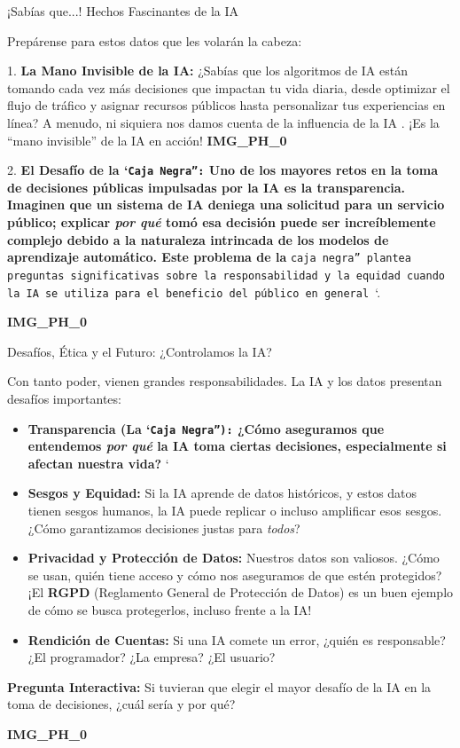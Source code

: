 \documentclass[aspectratio=169]{beamer}
\begin{document}
\begin{frame}[fragile]{¡Sabías que...! Hechos Fascinantes de la IA}


Prepárense para estos datos que les volarán la cabeza:

1.  \textbf{La Mano Invisible de la IA:} ¿Sabías que los algoritmos de IA están tomando cada vez más decisiones que impactan tu vida diaria, desde optimizar el flujo de tráfico y asignar recursos públicos hasta personalizar tus experiencias en línea? A menudo, ni siquiera nos damos cuenta de la influencia de la IA \texttt{\cite{Aparicio Araque, 2025}}. ¡Es la ``mano invisible'' de la IA en acción!
\textbf{IMG\_PH\_0}

2.  \textbf{El Desafío de la `\texttt{Caja Negra'':} Uno de los mayores retos en la toma de decisiones públicas impulsadas por la IA es la \textbf{transparencia}. Imaginen que un sistema de IA deniega una solicitud para un servicio público; explicar \textit{por qué} tomó esa decisión puede ser increíblemente complejo debido a la naturaleza intrincada de los modelos de aprendizaje automático. Este problema de la }\texttt{caja negra'' plantea preguntas significativas sobre la responsabilidad y la equidad cuando la IA se utiliza para el beneficio del público en general }\cite{Zouak Lara, 2025}`.

\textbf{IMG\_PH\_0}

\end{frame}



\begin{frame}[fragile]{Desafíos, Ética y el Futuro: ¿Controlamos la IA?}


Con tanto poder, vienen grandes responsabilidades. La IA y los datos presentan desafíos importantes:

\begin{itemize}
  \item \textbf{Transparencia (La `\texttt{Caja Negra''):} ¿Cómo aseguramos que entendemos \textit{por qué} la IA toma ciertas decisiones, especialmente si afectan nuestra vida? }\cite{Zouak Lara, 2025}`
  \item \textbf{Sesgos y Equidad:} Si la IA aprende de datos históricos, y estos datos tienen sesgos humanos, la IA puede replicar o incluso amplificar esos sesgos. ¿Cómo garantizamos decisiones justas para \textit{todos}?
  \item \textbf{Privacidad y Protección de Datos:} Nuestros datos son valiosos. ¿Cómo se usan, quién tiene acceso y cómo nos aseguramos de que estén protegidos? ¡El \textbf{RGPD} (Reglamento General de Protección de Datos) es un buen ejemplo de cómo se busca protegerlos, incluso frente a la IA! \texttt{\cite{Zouak Lara, 2025}}
  \item \textbf{Rendición de Cuentas:} Si una IA comete un error, ¿quién es responsable? ¿El programador? ¿La empresa? ¿El usuario?
\end{itemize}
\textbf{Pregunta Interactiva:} Si tuvieran que elegir el mayor desafío de la IA en la toma de decisiones, ¿cuál sería y por qué?

\textbf{IMG\_PH\_0}

\end{frame}
\end{document}
